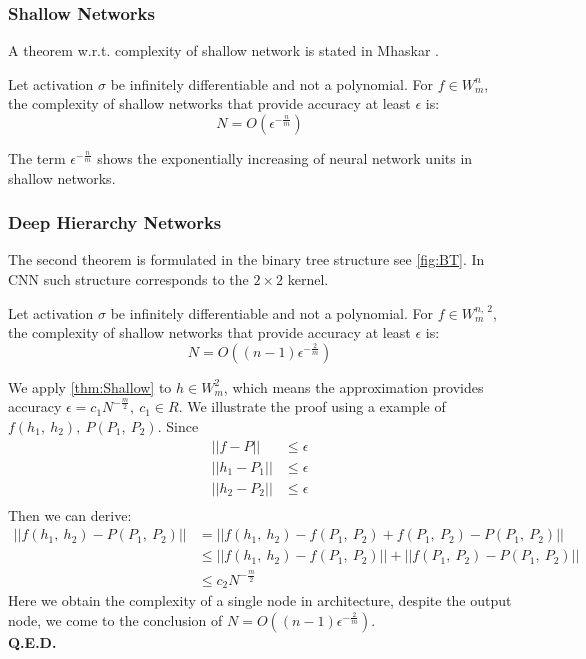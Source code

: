 \subsubsection{Shallow Networks}
A theorem w.r.t. complexity of shallow network is stated in 
Mhaskar \parencite{mhaskar1996neural}.
\begin{thm}
    \label{thm:Shallow}
    Let activation $ \sigma $ be infinitely differentiable and not 
    a polynomial. For $ f \in W_m^n $, the complexity of shallow networks
    that provide accuracy at least $ \epsilon $ is:
    \begin{equation}
        N = O(\epsilon^{-\frac{n}{m}})
    \end{equation}
\end{thm}
The term $ \epsilon^{-\frac{n}{m}} $ shows the exponentially increasing
of neural network units in shallow networks.

\subsubsection{Deep Hierarchy Networks}
The second theorem is formulated in the binary tree structure see 
\autoref{fig:BT}. In CNN such structure corresponds to the $ 2\times 2 $
kernel.
\begin{thm}
    Let activation $ \sigma $ be infinitely differentiable and not 
    a polynomial. For $ f \in W_m^{n,\ 2} $, the complexity of shallow networks
    that provide accuracy at least $ \epsilon $ is:
    \begin{equation}
        N = O((n-1)\epsilon^{-\frac{2}{m}})
    \end{equation}
\end{thm}

\begin{prf}
    We apply \autoref{thm:Shallow} to $ h \in W_m^2 $, which means the
    approximation provides accuracy $ \epsilon = c_1N^{-\frac{m}{2}},\ c_1 \in R $.
    We illustrate the proof using a example of $ f(h_1,\ h_2),\ P(P_1,\ P_2) $.
    Since
    \begin{equation}
        \begin{split}
            ||f-P|| & \leq \epsilon \\
            ||h_1-P_1|| & \leq \epsilon \\
            ||h_2-P_2|| & \leq \epsilon \\            
        \end{split}
    \end{equation}
    Then we can derive:
    \begin{align}
        ||f(h_1,\ h_2) - P(P_1,\ P_2)|| & = ||f(h_1,\ h_2) - f(P_1,\ P_2) + f(P_1,\ P_2) - P(P_1,\ P_2)|| \\
        & \leq ||f(h_1,\ h_2) - f(P_1,\ P_2)|| + ||f(P_1,\ P_2) - P(P_1,\ P_2)|| \\
        & \leq c_2N^{-\frac{m}{2}}
    \end{align}
    Here we obtain the complexity of a single node in architecture, 
    despite the output node, we come to the conclusion of 
    $ N = O((n-1)\epsilon^{-\frac{2}{m}}) $. \\
    \textbf{Q.E.D.}
\end{prf}

